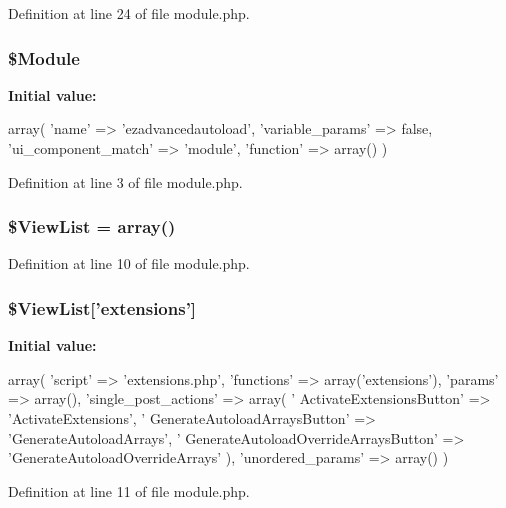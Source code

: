 Definition at line 24 of file module.\-php.

\hypertarget{module_8php_a643d60fb839b5d58f0725a88d0ecd1a0}{
\subsubsection[{\$\-Module}]{\setlength{\rightskip}{0pt plus 5cm}\$Module}}\label{module_8php_a643d60fb839b5d58f0725a88d0ecd1a0}
{\bfseries Initial value\-:}
\begin{DoxyCode}
 array(
                    'name' => 'ezadvancedautoload',
                    'variable_params' => false,
                    'ui_component_match' => 'module',
                    'function' => array()
)
\end{DoxyCode}


Definition at line 3 of file module.\-php.

\hypertarget{module_8php_a8e0c26fc38651904852a8f967a548fa2}{
\subsubsection[{\$\-View\-List}]{\setlength{\rightskip}{0pt plus 5cm}\$View\-List = array()}}\label{module_8php_a8e0c26fc38651904852a8f967a548fa2}


Definition at line 10 of file module.\-php.

\hypertarget{module_8php_a0cfec2359ce3a2faffb2a415c2bcbd21}{
\subsubsection[{\$\-View\-List}]{\setlength{\rightskip}{0pt plus 5cm}\$View\-List\mbox{[}'extensions'\mbox{]}}}\label{module_8php_a0cfec2359ce3a2faffb2a415c2bcbd21}
{\bfseries Initial value\-:}
\begin{DoxyCode}
 array(
                                    'script' => 'extensions.php',
                                    'functions' => array('extensions'),
                                    'params' => array(),
                                    'single_post_actions' => array( 
                                                        '
      ActivateExtensionsButton' => 'ActivateExtensions',
                                                        '
      GenerateAutoloadArraysButton' => 'GenerateAutoloadArrays',
                                                        '
      GenerateAutoloadOverrideArraysButton' => 'GenerateAutoloadOverrideArrays'
                                            ),
                                    'unordered_params' => array()
)
\end{DoxyCode}


Definition at line 11 of file module.\-php.

